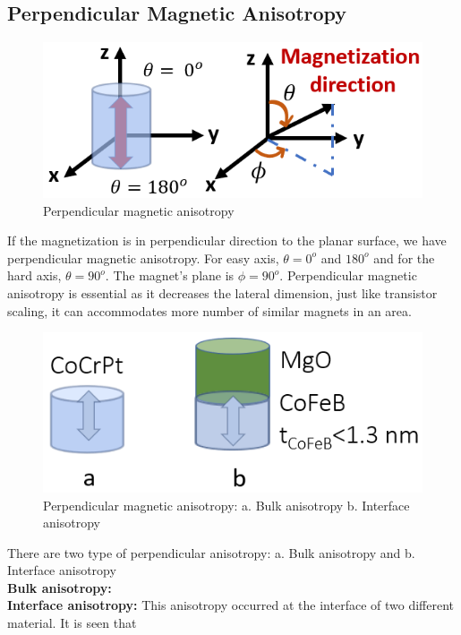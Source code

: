 \documentclass[12pt,a4paper,bold]{thesis}
\theoremstyle{thm}
\theoremstyle{definition}
\begin{document}
\subsection{Perpendicular Magnetic Anisotropy}
\begin{figure}[H]
	\centering
  \includegraphics[scale=0.56]{Images/22.png}
  \caption{Perpendicular magnetic anisotropy}
\end{figure}
If the magnetization is in perpendicular direction to the planar surface, we have perpendicular magnetic anisotropy. For easy axis, $\theta = 0^o$ and $180^o$ and for the hard axis, $\theta = 90^o$.  The magnet's plane is $\phi=90^o$. Perpendicular magnetic anisotropy is essential as it decreases the lateral dimension, just like transistor scaling, it can accommodates more number of similar magnets in an area.~\cite{ikeda2010perpendicular}
\begin{figure}[H]
	\centering
  \includegraphics[scale=0.56]{Images/23.png}
  \caption{Perpendicular magnetic anisotropy: a. Bulk anisotropy b. Interface anisotropy}
\end{figure}
There are two type of perpendicular anisotropy: a. Bulk anisotropy and b. Interface anisotropy\\
\textbf{Bulk anisotropy:} \\
\textbf{Interface anisotropy:} This anisotropy occurred at the interface of two different material. It is seen that 	
\end{document}

